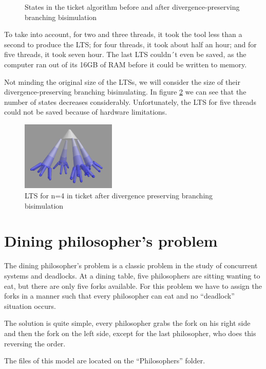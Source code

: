 \documentclass[11pt]{article}
\theoremstyle{definition}
\theoremstyle{plain}
\begin{document}
\begin{appendices}
\begin{figure}
{\begin{tikzpicture}
\end{tikzpicture}
}
\caption{States in the ticket algorithm before and after divergence-preserving branching bisimulation}\label{statesTicket}
\end{figure}

To take into account, for two and three threads, it took the tool less than a second to produce the LTS; for four threads, it took about half an hour; and for five threads, it took seven hour. The last LTS couldn´t even be saved, as the computer ran out of its 16GB of RAM before it could be written to memory.

Not minding the original size of the LTSs, we will consider the size of their divergence-preserving branching bisimulating. In figure \ref{n4dpbb} we can see that the number of states decreases considerably. Unfortunately, the LTS for five threads could not be saved because of hardware limitations.

\begin{figure}
\centering
\includegraphics[width=0.4\textwidth, keepaspectratio]{img/Ticket/n4dpbb.png}
\caption{LTS for n=4 in ticket after divergence preserving branching bisimulation}\label{n4dpbb}
\end{figure}
\clearpage
\section{Dining philosopher's problem}

The dining philosopher's problem is a classic problem in the study of concurrent systems and deadlocks. At a dining table, five philosophers are sitting wanting to eat, but there are only five forks available. For this problem we have to assign the forks in a manner such that every philosopher can eat and no ``deadlock'' situation occurs.

The solution is quite simple, every philosopher grabs the fork on his right side and then the fork on the left side, except for the last philosopher, who does this reversing the order.

The files of this model are located on the ``Philosophers'' folder.


\end{appendices}
\end{document}
